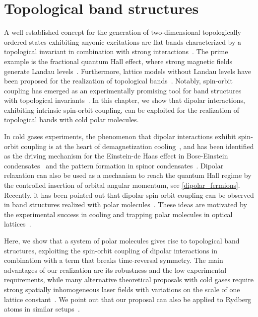 \chapter{Topological band structures}
\label{topological_bands}

A well established concept for the generation of two-dimensional topologically ordered states exhibiting anyonic excitations are flat bands characterized by a topological invariant in combination with strong interactions~\cite{Bergholtz2013,Parameswaran2013}.
The prime example is the fractional quantum Hall effect, where strong magnetic fields generate Landau levels~\cite{Nayak2008}.
Furthermore, lattice models without Landau levels have been proposed for the realization of topological bands~\cite{Haldane1988,Raghu2008,Wang2011,Neupert2011,Wang2012a,Grushin2012,Moller2009,Sun2010,Barkeshli2012,Wang2011a,Sterdyniak2013,Liu2012,Yao2013,Yang2012,Dauphin2012,Cooper2012,Cooper2013,Shi2013}.
Notably, spin-orbit coupling has emerged as an experimentally promising tool for band structures with topological invariants~\cite{Kane2005,Pesin2009,Qi2011,Hasan2010,Tang2011,Qiao2011}.
In this chapter, we show that dipolar interactions, exhibiting intrinsic spin-orbit coupling, can be exploited for the realization of topological bands with cold polar molecules.

In cold gases experiments, the phenomenon that dipolar interactions exhibit spin-orbit coupling is at the heart of demagnetization cooling~\cite{Hensler2003,Fattori2006,Pasquiou2011,DePaz2013a},
and has been identified as the driving mechanism for the Einstein-de Haas effect in Bose-Einstein condensates~\cite{Kawaguchi2006} and the pattern formation in spinor condensates~\cite{Santos2006,Vengalattore2008,Kurn2013}.
Dipolar relaxation can also be used as a mechanism to reach the quantum Hall regime by the controlled insertion of orbital angular momentum, see \cref{dipolar_fermions}.
Recently, it has been pointed out that dipolar spin-orbit coupling can be observed in band structures realized with polar molecules~\cite{Syzranov2014}.
These ideas are motivated by the experimental success in cooling and trapping polar molecules in optical lattices~\cite{Ni2008b,Yan2013}.

Here, we show that a system of polar molecules gives rise to topological band structures, exploiting the spin-orbit coupling of dipolar interactions in combination with a term that breaks time-reversal symmetry.
The main advantages of our realization are its robustness and the low experimental requirements, while many alternative theoretical proposals with cold gases require strong spatially inhomogeneous laser fields with variations on the scale of one lattice constant~\cite{Liu2010,Stanescu2010,Goldman2013,Li2008,Yao2012,Yao2013,Goldman2013,Jaksch2003}.
We point out that our proposal can also be applied to Rydberg atoms in similar setups~\cite{Barredo2014,Piotrowicz2013,Nogrette2014}.

